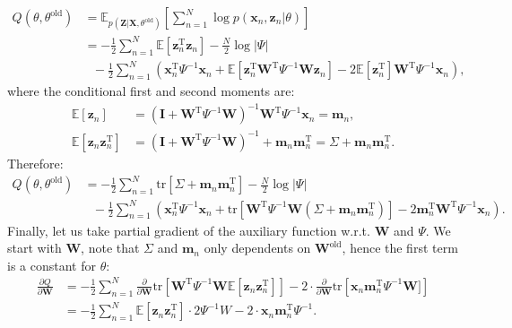 \documentclass[UTF8]{ctexart}
\begin{document}
$$
\begin{aligned}
Q(\theta,\theta^{\text{old}})&=\mathbb{E}_{p(\textbf{Z}|\textbf{X},\theta^{\text{old}})}\left[\sum_{n=1}^{N}\log p(\textbf{x}_{n},\textbf{z}_{n}|\theta) \right]\\
&=-\frac{1}{2}\sum_{n=1}^{N}\mathbb{E}[\textbf{z}_{n}^{\text{T}}\textbf{z}_{n}]-\frac{N}{2}\log|\Psi|\\
&\ \ \ -\frac{1}{2}\sum_{n=1}^{N}\left(\textbf{x}_{n}^{\text{T}}\Psi^{-1}\textbf{x}_{n}+\mathbb{E}[\textbf{z}_{n}^{\text{T}}\textbf{W}^{\text{T}}\Psi^{-1}\textbf{W}\textbf{z}_{n}]-2\mathbb{E}[\textbf{z}_{n}^{\text{T}}]\textbf{W}^{\text{T}}\Psi^{-1}\textbf{x}_{n} \right),
\end{aligned}
$$
where the conditional first and second moments are:
$$
\begin{aligned}
\mathbb{E}[\textbf{z}_{n}]&=(\textbf{I}+\textbf{W}^{\text{T}}\Psi^{-1}\textbf{W})^{-1}\textbf{W}^{\text{T}}\Psi^{-1}\textbf{x}_{n}=\textbf{m}_{n},\\
\mathbb{E}[\textbf{z}_{n}\textbf{z}_{n}^{\text{T}}]&=(\textbf{I}+\textbf{W}^{\text{T}}\Psi^{-1}\textbf{W})^{-1}+\textbf{m}_{n}\textbf{m}_{n}^{\text{T}}=\Sigma+\textbf{m}_{n}\textbf{m}_{n}^{\text{T}}.
\end{aligned}
$$
Therefore:
$$
\begin{aligned}
Q(\theta,\theta^{\text{old}})&=-\frac{1}{2}\sum_{n=1}^{N}\text{tr}\left[\Sigma+\textbf{m}_{n}\textbf{m}_{n}^{\text{T}}\right]-\frac{N}{2}\log |\Psi|\\
&\ \ \ -\frac{1}{2}\sum_{n=1}^{N}\left(\textbf{x}_{n}^{\text{T}}\Psi^{-1}\textbf{x}_{n}+\text{tr}\left[\textbf{W}^{\text{T}}\Psi^{-1}\textbf{W}(\Sigma+\textbf{m}_{n}\textbf{m}_{n}^{\text{T}}) \right]-2\textbf{m}_{n}^{\text{T}}\textbf{W}^{\text{T}}\Psi^{-1}\textbf{x}_{n} \right).
\end{aligned}
$$
Finally, let us take partial gradient of the auxiliary function w.r.t. $\textbf{W}$ and $\Psi$.
We start with $\textbf{W}$, note that $\Sigma$ and $\textbf{m}_{n}$ only dependents on $\textbf{W}^{\text{old}}$, hence the first term is a constant for $\theta$:
$$
\begin{aligned}
\frac{\partial Q}{\partial \textbf{W}}&=-\frac{1}{2}\sum_{n=1}^{N}\frac{\partial}{\partial \textbf{W}}\text{tr}\left[\textbf{W}^{\text{T}}\Psi^{-1}\textbf{W}\mathbb{E}[\textbf{z}_{n}\textbf{z}_{n}^{\text{T}}]\right]-2\cdot\frac{\partial}{\partial \textbf{W}}\text{tr}\left[\textbf{x}_{n}\textbf{m}_{n}^{\text{T}}\Psi^{-1}\textbf{W}] \right]\\
&=-\frac{1}{2}\sum_{n=1}^{N}\mathbb{E}[\textbf{z}_{n}\textbf{z}_{n}^{\text{T}}]\cdot 2\Psi^{-1}W-2\cdot\textbf{x}_{n}\textbf{m}_{n}^{\text{T}}\Psi^{-1}.
\end{aligned}
$$
\end{document}
